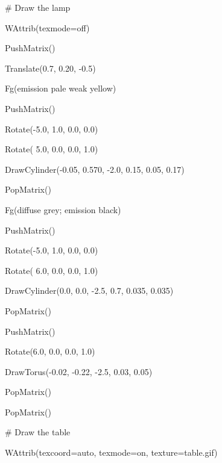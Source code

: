 \documentclass[letterpaper]{article}
\begin{document}
\bigskip

{\sffamily
\ \ \ \# Draw the lamp}

{\sffamily
\ \ \ WAttrib({\textquotedbl}texmode=off{\textquotedbl})}

{\sffamily
\ \ \ PushMatrix()}

{\sffamily
\ \ \ Translate(0.7, 0.20, -0.5)}

{\sffamily
\ \ \ Fg({\textquotedbl}emission pale weak yellow{\textquotedbl})}

{\sffamily
\ \ \ PushMatrix()}

{\sffamily
\ \ \ Rotate(-5.0, 1.0, 0.0, 0.0)}

{\sffamily
\ \ \ Rotate( 5.0, 0.0, 0.0, 1.0)}

{\sffamily
\ \ \ DrawCylinder(-0.05, 0.570, -2.0, 0.15, 0.05, 0.17)}

{\sffamily
\ \ \ PopMatrix()}

{\sffamily
\ \ \ Fg({\textquotedbl}diffuse grey; emission black{\textquotedbl})}

{\sffamily
\ \ \ PushMatrix()}

{\sffamily
\ \ \ Rotate(-5.0, 1.0, 0.0, 0.0)}

{\sffamily
\ \ \ Rotate( 6.0, 0.0, 0.0, 1.0)}

{\sffamily
\ \ \ DrawCylinder(0.0, 0.0, -2.5, 0.7, 0.035, 0.035)}

{\sffamily
\ \ \ PopMatrix()}

{\sffamily
\ \ \ PushMatrix()}

{\sffamily
\ \ \ Rotate(6.0, 0.0, 0.0, 1.0)}

{\sffamily
\ \ \ DrawTorus(-0.02, -0.22, -2.5, 0.03, 0.05)}

{\sffamily
\ \ \ PopMatrix() \ }

{\sffamily
\ \ \ PopMatrix()}


\bigskip

{\sffamily
\ \ \ \# Draw the table }

{\sffamily
\ \ \ WAttrib({\textquotedbl}texcoord=auto{\textquotedbl}, {\textquotedbl}texmode=on{\textquotedbl},
{\textquotedbl}texture=table.gif{\textquotedbl})}
\end{document}
